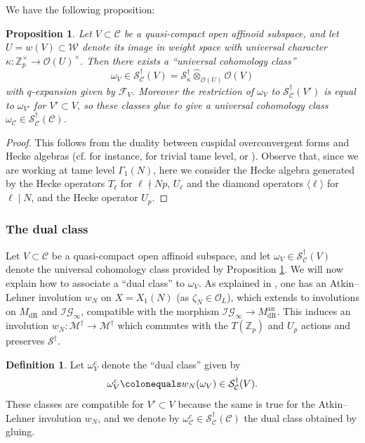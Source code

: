 \documentclass[10pt, oneside]{amsart}
\newcommand{\defeq}{\colonequals}
\numberwithin{equation}{subsection}
\newtheorem{proposition}[equation]{Proposition}
\theoremstyle{definition}
\newtheorem{definition}[equation]{Definition}
\theoremstyle{remark}
\newcommand{\mbb}[1]{\mathbb{#1}}
\newcommand{\hatot}{\hat{\otimes}}
\newcommand{\opn}[1]{\operatorname{#1}}
\begin{document}
We have the following proposition:

\begin{proposition} \label{UniversalClassProp}
Let $V \subset \mathcal{C}$ be a quasi-compact open affinoid subspace, and let $U = w(V) \subset \mathcal{W}$ denote its image in weight space with universal character $\kappa \colon \mbb{Z}_p^{\times} \to \mathcal{O}(U)^{\times}$. Then there exists a ``universal cohomology class''
\[
\omega_{V} \in \mathcal{S}^{\dagger}_{\mathcal{C}}(V) = \mathscr{S}^{\dagger}_{\kappa} \hatot_{\mathcal{O}(U)} \mathcal{O}(V)
\]
with $q$-expansion given by $\mathcal{F}_{V}$. Moreover the restriction of $\omega_{V}$ to $\mathcal{S}^{\dagger}_{\mathcal{C}}(V')$ is equal to $\omega_{V'}$ for $V' \subset V$, so these classes glue to give a universal cohomology class $\omega_{\mathcal{C}} \in \mathcal{S}^{\dagger}_{\mathcal{C}}(\mathcal{C})$.
\end{proposition}
\begin{proof}
This follows from the duality between cuspidal overconvergent forms and Hecke algebras (cf. for instance, \cite[\S 4.2]{Urban} for trivial tame level, or \cite[Proposition B5.6]{Coleman}). Observe that, since we are working at tame level $\Gamma_1(N)$, here we consider the Hecke algebra generated by the Hecke operators $T_\ell$ for $\ell \nmid N p$, $U_\ell$ and the diamond operators $\langle \ell \rangle$ for $\ell \mid N$, and the Hecke operator $U_p$.
\end{proof}

\subsubsection{The dual class} 

Let $V \subset \mathcal{C}$ be a quasi-compact open affinoid subspace, and let $\omega_{V} \in \mathcal{S}^{\dagger}_{\mathcal{C}}(V)$ denote the universal cohomology class provided by Proposition \ref{UniversalClassProp}. We will now explain how to associate a ``dual class'' to $\omega_{V}$. As explained in \cite[\S 5.2]{AI_LLL}, one has an Atkin--Lehner involution $w_N$ on $X = X_1(N)$ (as $\zeta_N \in \mathcal{O}_L$), which extends to involutions on $M_{\opn{dR}}$ and $\mathcal{IG}_{\infty}$, compatible with the morphism $\mathcal{IG}_{\infty} \to M_{\opn{dR}}^{\opn{an}}$. This induces an involution $w_N \colon \mathscr{M}^{\dagger} \to \mathscr{M}^{\dagger}$ which commutes with the $T(\mbb{Z}_p)$ and $U_p$ actions and preserves $\mathscr{S}^{\dagger}$.

\begin{definition}
Let $\omega_{V}^c$ denote the ``dual class'' given by
\[
\omega^c_{V} \defeq w_N(\omega_{V}) \in \mathcal{S}^{\dagger}_{\mathcal{C}}(V) .
\]
These classes are compatible for $V' \subset V$ because the same is true for the Atkin--Lehner involution $w_N$, and we denote by $\omega_{\mathcal{C}}^c \in \mathcal{S}^{\dagger}_{\mathcal{C}}(\mathcal{C})$ the dual class obtained by gluing. 
\end{definition}
\end{document}

